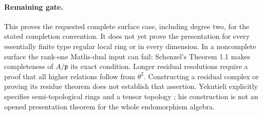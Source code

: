 \paragraph{Remaining gate.}
This proves the requested complete surface case, including degree two,
for the stated completion convention. It does not yet prove the
presentation for every essentially finite type regular local ring or
in every dimension. In a noncomplete surface the rank-one Matlis-dual
input can fail: Schenzel's Theorem 1.1 makes completeness of
$A/\mathfrak p$ its exact condition. Longer residual resolutions
require a proof that all higher relations follow from $\theta^2$.
Constructing a residual complex or proving its residue theorem does
not establish that assertion. Yekutieli explicitly specifies
semi-topological rings and a tensor topology
\cite[Definitions 1.2.1 and 1.2.11, pp.~15 and 18]{Yekutieli1992};
his construction is not an opened presentation theorem for the whole
endomorphism algebra.

